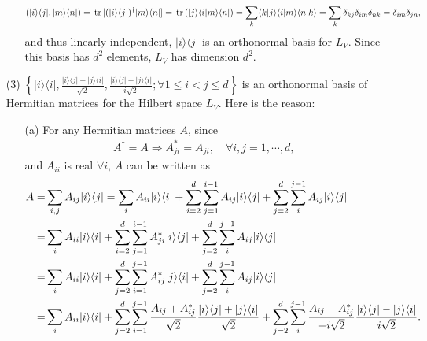\documentclass[en]{sol-man}
\begin{document}
\begin{sol}
\begin{itemize}
\begin{itemize}
            \begin{align}
                (\lvert i\rangle\langle j\rvert,\lvert m\rangle\langle n\rvert)=\,\mathrm{tr}\,[(\lvert i\rangle\langle j\rvert)^{\dagger}\lvert m\rangle\langle n\rvert]=\,\mathrm{tr}\,(\lvert j\rangle\langle i\vert m\rangle\langle n\rvert)=\sum_k\langle k\rvert j\rangle\langle i\vert m\rangle\langle n\vert k\rangle=\sum_k\delta_{kj}\delta_{im}\delta_{nk}=\delta_{im}\delta_{jn},
            \end{align}
            and thus linearly independent, $\lvert i\rangle\langle j\rvert$ is an orthonormal basis for $L_V$. Since this basis has $d^2$ elements, $L_V$ has dimension $d^2$.
        \end{itemize}
        \item[(3)] $\left\{\lvert i\rangle\langle i\rvert,\frac{\lvert i\rangle\langle j\rvert+\lvert j\rangle\langle i\rvert}{\sqrt{2}},\frac{\lvert i\rangle\langle j\rvert-\lvert j\rangle\langle i\rvert}{i\sqrt{2}};\forall 1\leq i<j\leq d\right\}$ is an orthonormal basis of Hermitian matrices for the Hilbert space $L_V$. Here is the reason:
        \begin{itemize}
            \item[(a)] For any Hermitian matrices $A$, since
            \begin{align}
                A^{\dagger}=A\Longrightarrow A_{ji}^*=A_{ji},\quad\forall i,j=1,\cdots,d,
            \end{align}
            and $A_{ii}$ is real $\forall i$, $A$ can be written as
            \begin{align}
                \notag A=&\sum_{i,j}A_{ij}\lvert i\rangle\langle j\rvert=\sum_iA_{ii}\lvert i\rangle\langle i\rvert+\sum_{i=2}^d\sum_{j=1}^{i-1}A_{ij}\lvert i\rangle\langle j\rvert+\sum_{j=2}^d\sum_i^{j-1}A_{ij}\lvert i\rangle\langle j\rvert\\
                \notag=&\sum_iA_{ii}\lvert i\rangle\langle i\rvert+\sum_{i=2}^d\sum_{j=1}^{i-1}A_{ji}^*\lvert i\rangle\langle j\rvert+\sum_{j=2}^d\sum_i^{j-1}A_{ij}\lvert i\rangle\langle j\rvert\\
                \notag=&\sum_iA_{ii}\lvert i\rangle\langle i\rvert+\sum_{j=2}^d\sum_{i=1}^{j-1}A_{ij}^*\lvert j\rangle\langle i\rvert+\sum_{j=2}^d\sum_i^{j-1}A_{ij}\lvert i\rangle\langle j\rvert\\
                \notag=&\sum_iA_{ii}\lvert i\rangle\langle i\rvert+\sum_{j=2}^d\sum_{i=1}^{j-1}\frac{A_{ij}+A_{ij}^*}{\sqrt{2}}\frac{\lvert i\rangle\langle j\rvert+\lvert j\rangle\langle i\rvert}{\sqrt{2}}+\sum_{j=2}^d\sum_i^{j-1}\frac{A_{ij}-A_{ij}^*}{-i\sqrt{2}}\frac{\lvert i\rangle\langle j\rvert-\lvert j\rangle\langle i\rvert}{i\sqrt{2}}.

\end{align}
\end{itemize}
\end{itemize}
\end{sol}
\end{document}
